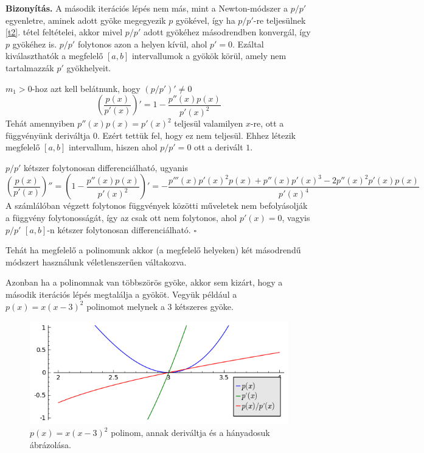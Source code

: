 \documentclass[a4paper,12pt]{report}
\newenvironment{Biz}{\noindent \textbf{Bizonyítás. }}{ $\square$}
\begin{document}
				\begin{Biz}
				    A második iterációs lépés nem más, mint a Newton-módszer a $p/p'$ egyenletre, aminek adott gyöke megegyezik $p$ gyökével, így ha $p/p'$-re teljesülnek \ref{t2}. tétel feltételei, akkor mivel $p/p'$ adott gyökéhez másodrendben konvergál, így $p$ gyökéhez is. $p/p'$ folytonos azon a helyen kívül, ahol $p'=0$. Ezáltal kiválaszthatók a megfelelő $[a,b]$ intervallumok a gyökök körül, amely nem tartalmazzák $p'$ gyökhelyeit.

				    $m_1>0$-hoz azt kell belátnunk, hogy $(p/p')'\neq 0$
				    \[\left( \frac{p(x)}{p'(x)} \right)'=1-\frac{p''(x)p(x)}{p'(x)^2}\]
				    Tehát amennyiben $p''(x)p(x)=p'(x)^2$ teljesül valamilyen $x$-re, ott a függvényünk deriváltja $0$. Ezért tettük fel, hogy ez nem teljesül. Ehhez létezik megfelelő $[a,b]$ intervallum, hiszen ahol $p/p'=0$ ott a derivált $1$.

				    $p/p'$ kétszer folytonosan differenciálható, ugyanis
				    \[\left( \frac{p(x)}{p'(x)} \right)''=\left(1-\frac{p''(x)p(x)}{p'(x)^2}\right)'=-\frac{p'''(x)p'(x)^2p(x)+p''(x)p'(x)^3-2p''(x)^2p'(x)p(x)}{p'(x)^4}\]
				    A számlálóban végzett folytonos függvények közötti műveletek nem befolyásolják a függvény folytonosságát, így az csak ott nem folytonos, ahol $p'(x)=0$, vagyis $p/p'$ $[a,b]$-n kétszer folytonosan differenciálható.
				\end{Biz}

				Tehát ha megfelelő a polinomunk akkor (a megfelelő helyeken) két másodrendű módszert használunk véletlenszerűen váltakozva.

				Azonban ha a polinomnak van többszörös gyöke, akkor sem kizárt, hogy a második iterációs lépés megtalálja a gyököt. Vegyük például a $p(x)=x(x-3)^2$ polinomot melynek a $3$ kétszeres gyöke.

				\begin{figure}[ht]
					\centering
					\includegraphics[scale=0.7]{kepek/multi.png}
					\caption{$p(x)=x(x-3)^2$ polinom, annak deriváltja és a hányadosuk ábrázolása.}\label{img:multiple}
				\end{figure}
\end{document}
